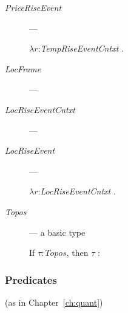 \begin{description}
  \item[\textnormal{\textit{PriceRiseEvent}}] --- \mbox{}

   $\lambda
r$:\textit{TempRiseEventCntxt} .\\  
\hspace*{2em}
      
    \item[\textnormal{\textit{LocFrame}}] --- 
      
    \item[\textnormal{\textit{LocRiseEventCntxt}}] ---
                       
 \item[\textnormal{\textit{LocRiseEvent}}] ---

   $\lambda
r$:\textit{LocRiseEventCntxt} .\\  
\hspace*{2em}

      
    \item[\textnormal{\textit{Topos}}] --- a basic type

      If $\tau:\textit{Topos}$, then $\tau$ :  

                       


\end{description}

    \subsubsection{Predicates} (as in Chapter~\ref{ch:quant})


